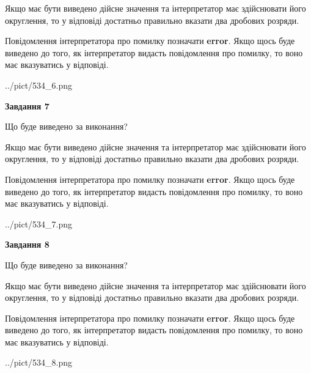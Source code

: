 \documentclass[12pt, ukrainian]{article}
\begin{document}
{\begin {Large}
Якщо має бути виведено дійсне значення та інтерпретатор має здійснювати його округлення, 
то у відповіді достатньо правильно вказати два дробових розряди.

Повідомлення інтерпретатора про помилку позначати \textbf{error}.
Якщо щось буде виведено до того, як інтерпретатор видасть повідомлення про помилку, 
то воно має вказуватись у відповіді. \par

\begin{center}
	{../pict/534_6.png}
\end{center}
\newpage

{\begin {center}\textbf{Завдання 7}\end {center}}\par
Що буде виведено за виконання? \par

Якщо має бути виведено дійсне значення та інтерпретатор має здійснювати його округлення, 
то у відповіді достатньо правильно вказати два дробових розряди.

Повідомлення інтерпретатора про помилку позначати \textbf{error}.
Якщо щось буде виведено до того, як інтерпретатор видасть повідомлення про помилку, 
то воно має вказуватись у відповіді. \par

\begin{center}
	{../pict/534_7.png}
\end{center}
\newpage

{\begin {center}\textbf{Завдання 8}\end {center}}\par
Що буде виведено за виконання? \par

Якщо має бути виведено дійсне значення та інтерпретатор має здійснювати його округлення, 
то у відповіді достатньо правильно вказати два дробових розряди.

Повідомлення інтерпретатора про помилку позначати \textbf{error}.
Якщо щось буде виведено до того, як інтерпретатор видасть повідомлення про помилку, 
то воно має вказуватись у відповіді. \par

\begin{center}
	{../pict/534_8.png}
\end{center}
\newpage


\end{Large}}
\end{document}
